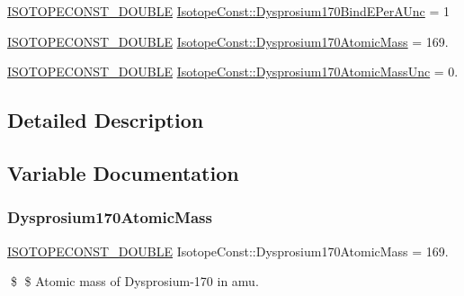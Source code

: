 \begin{DoxyCompactItemize}
\mbox{\hyperlink{group___isotope_const-_macros_ga8f45a7272ce02c0b4c65c44636ed719a}{I\+S\+O\+T\+O\+P\+E\+C\+O\+N\+S\+T\+\_\+\+D\+O\+U\+B\+LE}} \mbox{\hyperlink{group___isotope_const-_dysprosium-_dy170_gaecff5dfd057df77f05b3e6935b0bd935}{Isotope\+Const\+::\+Dysprosium170\+Bind\+E\+Per\+A\+Unc}} = 1
\item 
\mbox{\hyperlink{group___isotope_const-_macros_ga8f45a7272ce02c0b4c65c44636ed719a}{I\+S\+O\+T\+O\+P\+E\+C\+O\+N\+S\+T\+\_\+\+D\+O\+U\+B\+LE}} \mbox{\hyperlink{group___isotope_const-_dysprosium-_dy170_ga3e969c7a7410e6e5c1dacf43a662ad60}{Isotope\+Const\+::\+Dysprosium170\+Atomic\+Mass}} = 169.
\item 
\mbox{\hyperlink{group___isotope_const-_macros_ga8f45a7272ce02c0b4c65c44636ed719a}{I\+S\+O\+T\+O\+P\+E\+C\+O\+N\+S\+T\+\_\+\+D\+O\+U\+B\+LE}} \mbox{\hyperlink{group___isotope_const-_dysprosium-_dy170_gaa913d874ea36d22368af665d8e23bb10}{Isotope\+Const\+::\+Dysprosium170\+Atomic\+Mass\+Unc}} = 0.
\end{DoxyCompactItemize}


\subsection{Detailed Description}


\subsection{Variable Documentation}
\mbox{\label{group___isotope_const-_dysprosium-_dy170_ga3e969c7a7410e6e5c1dacf43a662ad60}} 
\subsubsection{\texorpdfstring{Dysprosium170\+Atomic\+Mass}{Dysprosium170AtomicMass}}
{\footnotesize\ttfamily \mbox{\hyperlink{group___isotope_const-_macros_ga8f45a7272ce02c0b4c65c44636ed719a}{I\+S\+O\+T\+O\+P\+E\+C\+O\+N\+S\+T\+\_\+\+D\+O\+U\+B\+LE}} Isotope\+Const\+::\+Dysprosium170\+Atomic\+Mass = 169.}

\$ \$ Atomic mass of Dysprosium-\/170 in amu. \mbox{\label{group___isotope_const-_dysprosium-_dy170_gaa913d874ea36d22368af665d8e23bb10}} 
